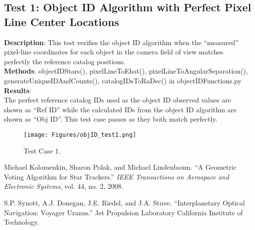 \documentclass[]{DINOReportMemo}
\begin{document}
\subsection{Test 1: Object ID Algorithm with Perfect Pixel Line Center Locations}
\textbf{Description}: This test verifies the object ID algorithm when the ``measured'' pixel-line coordinates for each object in the camera field of view matches perfectly the reference catalog positions. \\
\textbf{Methods}: objectIDStars(), pixelLineToEhat(), pixelLineToAngularSeparation(), generateUniqueIDAndCounts(), catalogIDsToRaDec() in objectIDFunctions.py\\
\textbf{Results}: \\
The perfect reference catalog IDs used as the object ID observed values are shown as ``Ref ID'' while the calculated IDs from the object ID algorithm are shown as ``Obj ID''. This test case passes as they both match perfectly.
\begin{figure}[H]
  \begin{center}
  \texttt{[image: Figures/objID\_test1.png]}
  \caption{Test Case 1.}
  \label{fig:test1}
  \end{center} 
\end{figure}

\begin{thebibliography}{9}
Michael Kolomenkin, Sharon Polak, and Michael Lindenbaum. ``A Geometric Voting Algorithm for Star Trackers.'' 
\textit{IEEE Transactions on Aerospace and Electronic Systems}, vol. 44, no. 2, 2008.

S.P. Synott, A.J. Donegan, J.E. Riedel, and J.A. Stuve. ``Interplanetary Optical Navigation: Voyager Uranus.'' Jet Propulsion Laboratory California Institute of Technology.
\end{thebibliography}
\end{document}
